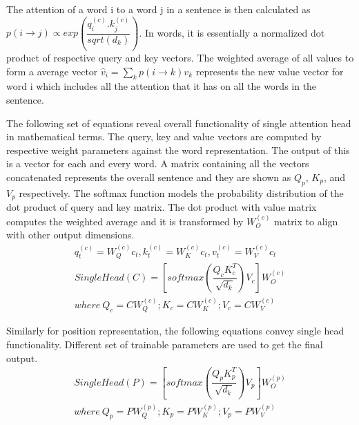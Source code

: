 \documentclass[a4paper, 11pt]{article}
\begin{document}
The attention of a word i to a word j in a sentence is then calculated as 
$ p(i\rightarrow{}j) \propto exp(\dfrac{q^{(c)}_i.k^{(c)}_j}{sqrt(d_k)}) $. In words, it is essentially a normalized dot product of respective query and key vectors. The weighted average of all values to form a average vector $\hat{v}_i = \sum_k p(i\rightarrow{}k)v_k$ represents the new value vector for word i which includes all the attention that it has on all the words in the sentence. 

The following set of equations reveal overall functionality of single attention head in mathematical terms. The query, key and value vectors are computed by respective weight parameters against the word representation. The output of this is a vector for each and every word. A matrix containing all the vectors concatenated represents the overall sentence and they are shown as $Q_p$, $K_p$, and $V_p$ respectively. The softmax function models the probability distribution of the dot product of query and key matrix. The dot product with value matrix computes the weighted average and it is transformed by $W^{(c)}_O$ matrix to align with other output dimensions.
\begin{align*}
q^{(c)}_t = W^{(c)}_Q c_t, k^{(c)}_t = W^{(c)}_K c_t, v^{(c)}_t = W^{(c)}_V c_t \\
SingleHead(C) = \left[softmax\left(\dfrac{Q_cK^T_c}{\sqrt{d_k}}\right) V_c\right] W^{(c)}_O \\
where\ Q_c = C{}W^{(c)}_Q; K_c = C{}W^{(c)}_K; V_c = C{}W^{(c)}_V  
\end{align*}

Similarly for position representation, the following equations convey single head functionality. Different set of trainable parameters are used to get the final output.
\begin{align*}
SingleHead(P) = \left[softmax\left(\dfrac{Q_pK^T_p}{\sqrt{d_k}}\right) V_p\right] W^{(p)}_O \\
where\ Q_p = P{}W^{(p)}_Q; K_p = P{}W^{(p)}_K; V_p = P{}W^{(p)}_V
\end{align*}
\end{document}
